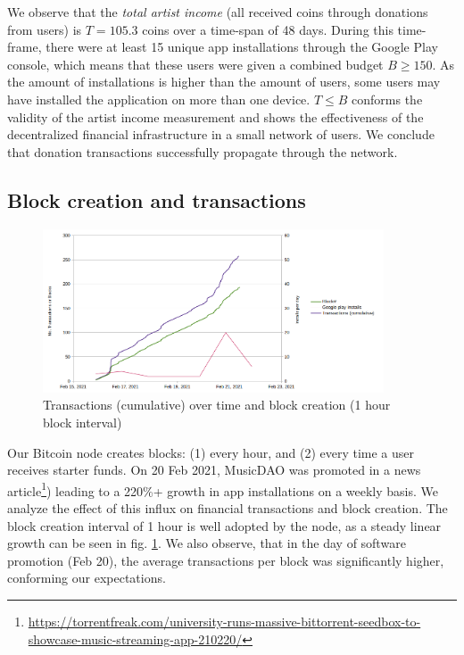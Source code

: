 We observe that the \textit{total artist income} (all received coins through donations from users) is $T=105.3$ coins over a time-span of 48 days. During this time-frame, there were at least 15 unique app installations through the Google Play console, which means that these users were given a combined budget $B\geq 150$. As the amount of installations is higher than the amount of users, some users may have installed the application on more than one device. $T\leq B$ conforms the validity of the artist income measurement and shows the effectiveness of the decentralized financial infrastructure in a small network of users. We conclude that donation transactions successfully propagate through the network.

\subsection{Block creation and transactions}
\begin{figure}
    \centering
    \includegraphics[width=0.9\textwidth]{evaluation/transactions-torrentfreak-3.png}
    \caption{Transactions (cumulative) over time and block creation (1 hour block interval)}
    \label{fig:transactions}
\end{figure}
Our Bitcoin node creates blocks: (1) every hour, and (2) every time a user receives starter funds. On 20 Feb 2021, MusicDAO was promoted in a news article\footnote{\url{https://torrentfreak.com/university-runs-massive-bittorrent-seedbox-to-showcase-music-streaming-app-210220/}}) leading to a 220\%+ growth in app installations on a weekly basis. We analyze the effect of this influx on financial transactions and block creation. The block creation interval of 1 hour is well adopted by the node, as a steady linear growth can be seen in fig. \ref{fig:transactions}. We also observe, that in the day of software promotion (Feb 20), the average transactions per block was significantly higher, conforming our expectations.

